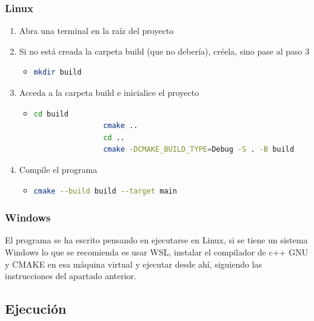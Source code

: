 \documentclass[a4paper, 12.5pt]{report}
\begin{document}
    \subsubsection*{Linux}

    \begin{enumerate}
        \item Abra una terminal en la raíz del proyecto
        \item Si no está creada la carpeta build (que no debería), créela, sino pase al paso 3
        \begin{itemize}
            \item \begin{lstlisting}[language=bash]
				mkdir build
            \end{lstlisting}
        \end{itemize}
        \item Acceda a la carpeta build e inicialice el proyecto
        \begin{itemize}
            \item \begin{lstlisting}[language=bash]
				cd build
				cmake ..
				cd ..
				cmake -DCMAKE_BUILD_TYPE=Debug -S . -B build
            \end{lstlisting}
        \end{itemize}
        \item Compile el programa
        \begin{itemize}
            \item \begin{lstlisting}[language=bash]
				cmake --build build --target main
            \end{lstlisting}
        \end{itemize}
    \end{enumerate}

    \subsubsection{Windows}

    El programa se ha escrito pensando en ejecutarse en Linux, si se tiene un sistema Windows lo que se recomienda es usar WSL, instalar el compilador de c++ GNU y CMAKE en esa máquina virtual y ejecutar desde ahí, siguiendo las instrucciones del apartado anterior.

    \subsection{Ejecución}
\end{document}
